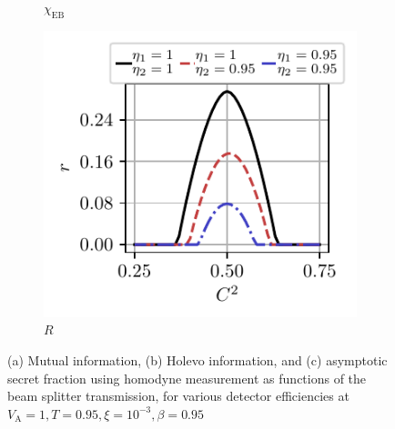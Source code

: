 \documentclass[%
reprint,
superscriptaddress,
 amsmath,amssymb,amsfonts,
 aps,
 pra,
 longbibliography
]{revtex4-2}
\newcommand{\ind}[1]{\mathrm{#1}}
\begin{document}
\begin{figure}
\begin{subfigure}[c]{.3\linewidth}
\caption[]{$\chi_{\ind{EB}}$}
\end{subfigure}
\hfill
    \begin{subfigure}[c]{.3\linewidth}
\includegraphics[width=\linewidth, trim={.2cm .3cm .4cm .35cm},clip]{pics/qkd/hom/r.pdf}
\caption[]{$R$}
        \end{subfigure}
        \caption{(a) Mutual information, (b) Holevo information, and (c) asymptotic secret fraction using homodyne measurement as functions of the beam splitter transmission, for various detector efficiencies at $V_{\ind{A}}=1, T=0.95, \xi=10^{-3}, \beta=0.95$
}
\label{fig:homodyne-all}
\end{figure}
\end{document}
